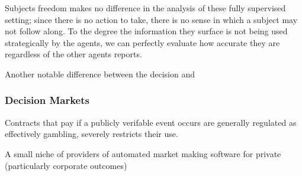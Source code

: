 Subjects freedom makes no difference in the analysis of these fully supervised setting; since there is no action to take, there is no sense in which a subject may not follow along. To the degree the information they surface is not being used strategically by the agents, we can perfectly evaluate how accurate they are regardless of the other agents reports.





Another notable difference between the decision and 




\subsubsection{Decision Markets}

Contracts that pay if a publicly verifable event occurs are generally regulated as effectively gambling,  severely restricts their use. 

A small  niche of providers of automated market making software for private (particularly corporate outcomes)


 
\cite{berg2003prediction,hanson2002decision,othman2010decision,boutilier2012eliciting,chen2014eliciting}


